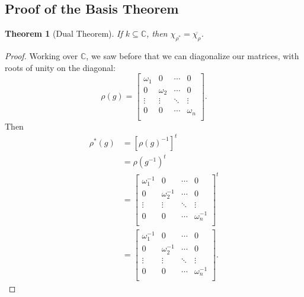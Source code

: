 \documentclass[12pt]{article}
\newcommand{\cx}{\mathbb{C}}
\newcommand\inv[1]{#1^{-1}}
\newtheorem{theorem}{Theorem}[section]
\theoremstyle{definition}
\begin{document}
\subsection{Proof of the Basis Theorem}
\begin{theorem}[Dual Theorem]
    If $k \subseteq \cx$, then $\chi_{\rho^*} = \overline{\chi_{\rho}}$. 
\end{theorem}
\begin{proof}
    Working over $\cx$, we saw before that we can diagonalize our matrices, with roots of unity on the diagonal:
    \begin{equation}
        \rho(g) = 
        \begin{bmatrix}
            \omega_1 & 0 & \cdots & 0 \\
            0 & \omega_2 & \cdots & 0 \\
            \vdots & \vdots & \ddots & \vdots \\
            0 & 0 & \cdots & \omega_n \\
        \end{bmatrix}.
    \end{equation}
    Then 
    \begin{equation}
        \begin{split}
            \rho^*(g) & = \left[ \inv{\rho(g)} \right]^t \\
            & = \rho \left( \inv{g} \right)^t \\
            & = 
            \begin{bmatrix}
                \inv{\omega_1} & 0 & \cdots & 0 \\
                0 & \inv{\omega_2} & \cdots & 0 \\
                \vdots & \vdots & \ddots & \vdots \\
                0 & 0 & \cdots & \inv{\omega_n} \\
            \end{bmatrix}^t \\
            & = 
            \begin{bmatrix}
                \inv{\omega_1} & 0 & \cdots & 0 \\
                0 & \inv{\omega_2} & \cdots & 0 \\
                \vdots & \vdots & \ddots & \vdots \\
                0 & 0 & \cdots & \inv{\omega_n} \\
            \end{bmatrix}.
        \end{split}

\end{equation}
\end{proof}
\end{document}
